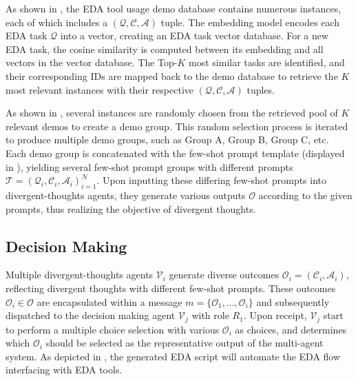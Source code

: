 As shown in , the EDA tool usage demo database contains numerous instances, each of which includes a $(\mathcal{Q}, \mathcal{C}, \mathcal{A})$ tuple. 
The embedding model encodes each EDA task $\mathcal{Q}$ into a vector, creating an EDA task vector database.
For a new EDA task, the cosine similarity is computed between its embedding and all vectors in the vector database.
The Top-$K$ most similar tasks are identified, and their corresponding IDs are mapped back to the demo database to retrieve the $K$ most relevant instances with their respective $(\mathcal{Q}, \mathcal{C}, \mathcal{A})$ tuples.

As shown in , several instances are randomly chosen from the retrieved pool of $K$ relevant demos to create a demo group. 
This random selection process is iterated to produce multiple demo groups, such as Group A, Group B, Group C, etc.
Each demo group is concatenated with the few-shot prompt template (displayed in ), yielding several few-shot prompt groups with different prompts $\mathcal{T} = {(\mathcal{Q}_{i}, \mathcal{C}_{i}, \mathcal{A}_{i})}^{\mathcal{N}}_{i=1}$.
Upon inputting these differing few-shot prompts into divergent-thoughts agents, they generate various outputs $\mathcal{O}$ according to the given prompts, thus realizing the objective of divergent thoughts.

\subsection{Decision Making}
\label{sec:multi-ChipAgent-dm}

Multiple divergent-thoughts agents $\mathcal{V}_{i}$ generate diverse outcomes $\mathcal{O}_{i} = (\mathcal{C}_{i}, \mathcal{A}_{i})$, reflecting divergent thoughts with different few-shot prompts. 
These outcomes $\mathcal{O}_{i} \in \mathcal{O}$ are encapsulated within a message $m = \{\mathcal{O}_{1}, ..., \mathcal{O}_{i}\}$ and subsequently dispatched to the decision making agent $\mathcal{V}_{j}$ with role $R_{1}$. 
Upon receipt, $\mathcal{V}_{j}$ start to perform a multiple choice selection with various $\mathcal{O}_{i}$ as choices, and determines which $\mathcal{O}_{i}$ should be selected as the representative output of the multi-agent system. 
As depicted in , the generated EDA script will automate the EDA flow interfacing with EDA tools.

